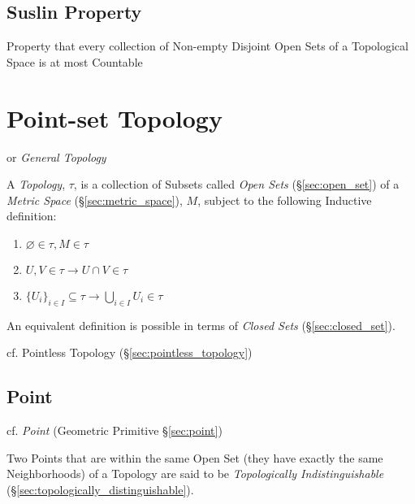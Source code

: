 \subsection{Suslin Property}\label{sec:suslin_property}

Property that every collection of Non-empty Disjoint Open Sets of a Topological
Space is at most Countable



\section{Point-set Topology}\label{sec:pointset_topology}

or \emph{General Topology}

A \emph{Topology}, $\tau$, is a collection of Subsets called
\emph{Open Sets} (\S\ref{sec:open_set}) of a \emph{Metric Space}
(\S\ref{sec:metric_space}), $M$, subject to the following Inductive
definition:
\begin{enumerate}
\item $\varnothing \in \tau, M \in \tau$
\item $U,V \in \tau \rightarrow U \cap V \in \tau$
\item $\{U_i\}_{i \in I} \subseteq \tau \rightarrow \bigcup_{i \in I}
  U_i \in \tau$
\end{enumerate}

An equivalent definition is possible in terms of \emph{Closed Sets}
(\S\ref{sec:closed_set}).

\fist cf. Pointless Topology (\S\ref{sec:pointless_topology})



\subsection{Point}\label{sec:topological_point}

cf. \emph{Point} (Geometric Primitive \S\ref{sec:point})

Two Points that are within the same Open Set (they have exactly the
same Neighborhoods) of a Topology are said to be \emph{Topologically
  Indistinguishable} (\S\ref{sec:topologically_distinguishable}).



